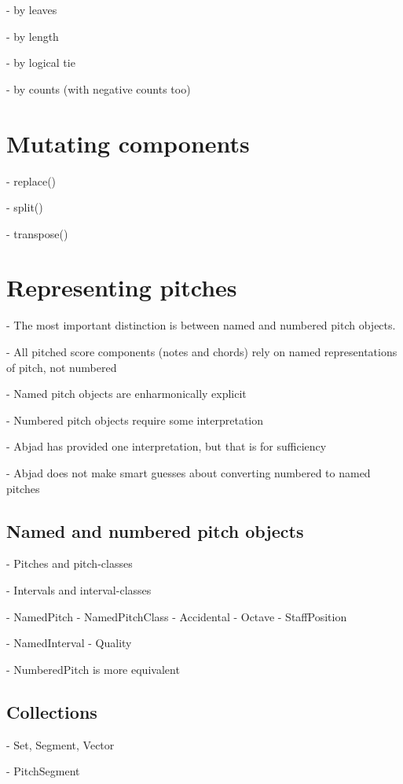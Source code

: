     -   by leaves

    -   by length

    -   by logical tie

    -   by counts (with negative counts too)

\section{Mutating components}

-   replace()

-   split()

-   transpose()

\section{Representing pitches}

-   The most important distinction is between named and numbered pitch
    objects.

-   All pitched score components (notes and chords) rely on named
    representations of pitch, not numbered

-   Named pitch objects are enharmonically explicit

-   Numbered pitch objects require some interpretation

-   Abjad has provided one interpretation, but that is for sufficiency

-   Abjad does not make smart guesses about converting numbered to named
    pitches

\subsection{Named and numbered pitch objects}

-   Pitches and pitch-classes

-   Intervals and interval-classes

-   NamedPitch
    -   NamedPitchClass
    -   Accidental
    -   Octave
    -   StaffPosition

-   NamedInterval
    -   Quality

-   NumberedPitch is more equivalent

\subsection{Collections}

-   Set, Segment, Vector

-   PitchSegment

